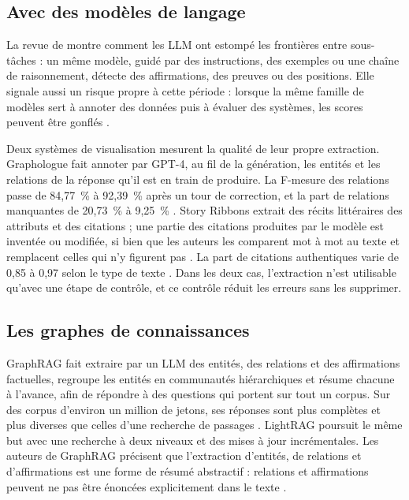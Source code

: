 \subsection{Avec des modèles de langage}

La revue de \textcite{ref06} montre comment les LLM ont estompé les frontières entre sous-tâches : un même modèle, guidé par des instructions, des exemples ou une chaîne de raisonnement, détecte des affirmations, des preuves ou des positions. Elle signale aussi un risque propre à cette période : lorsque la même famille de modèles sert à annoter des données puis à évaluer des systèmes, les scores peuvent être gonflés \parencite[7]{ref06}.

Deux systèmes de visualisation mesurent la qualité de leur propre extraction. Graphologue fait annoter par GPT-4, au fil de la génération, les entités et les relations de la réponse qu’il est en train de produire. La F-mesure des relations passe de 84,77~\% à 92,39~\% après un tour de correction, et la part de relations manquantes de 20,73~\% à 9,25~\% \parencite[11]{ref02}. Story Ribbons extrait des récits littéraires des attributs et des citations ; une partie des citations produites par le modèle est inventée ou modifiée, si bien que les auteurs les comparent mot à mot au texte et remplacent celles qui n’y figurent pas \parencite[3]{ref01}. La part de citations authentiques varie de 0,85 à 0,97 selon le type de texte \parencite[4]{ref01}. Dans les deux cas, l’extraction n’est utilisable qu’avec une étape de contrôle, et ce contrôle réduit les erreurs sans les supprimer.

\subsection{Les graphes de connaissances}
\label{sec:graphes}

GraphRAG \parencite{ref13} fait extraire par un LLM des entités, des relations et des affirmations factuelles, regroupe les entités en communautés hiérarchiques et résume chacune à l’avance, afin de répondre à des questions qui portent sur tout un corpus. Sur des corpus d’environ un million de jetons, ses réponses sont plus complètes et plus diverses que celles d’une recherche de passages \parencite[1]{ref13}. LightRAG \parencite{ref14} poursuit le même but avec une recherche à deux niveaux et des mises à jour incrémentales. Les auteurs de GraphRAG précisent que l’extraction d’entités, de relations et d’affirmations est une forme de résumé abstractif : relations et affirmations peuvent ne pas être énoncées explicitement dans le texte \parencite[5]{ref13}.

